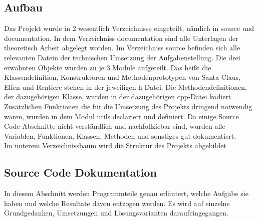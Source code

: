 \documentclass[a4paper,12pt]{article}
\begin{document}
\subsection{Aufbau}
Das Projekt wurde in 2 wesentlich Verzeichnisse eingeteilt, nämlich in source und documentation. In dem Verzeichniss documentation sind alle Unterlagen der theoretisch Arbeit 
abgelegt worden. Im Verzeichniss source befinden sich alle relevanten Datein der technischen Umsetzung der Aufgabenstellung.
Die drei erwähnten Objekte wurden zu je 3 Module aufgeteilt.
Das heißt die Klassendefinition, Konstruktoren und Methodenprototypen von Santa Claus, Elfen und Rentiere stehen in der jeweiligen h-Datei. Die Methodendefinitionen, der dazugehörigen Klasse,
wurden in der dazugehörigen cpp-Datei kodiert. Zusätzlichen Funktionen die für die Umsetzung des Projekts dringend notwendig waren, wurden in dem Modul utils declariert und definiert.
Da einige Source Code Abschnitte nicht verständlich und nachfollziebar sind, wurden alle Variablen, Funktionen, Klassen, Methoden und sonstiges gut dokumentiert.\\
\newpage
Im unterem Verzeichnissbaum wird die Struktur des Projekts abgebildet
\\
\newpage
\subsection{Source Code Dokumentation}
In diesem Abschnitt werden Programmteile genau erläutert, welche Aufgabe sie haben und welche Resultate davon entzogen werden.
Es wird auf einzelne Grundgedanken, Umsetzungen und Lösungsvarianten daraufeingegangen.
\end{document}
